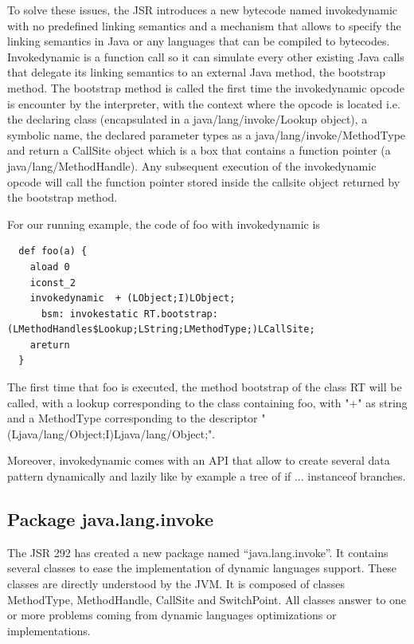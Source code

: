 \documentclass{sigplanconf}
\def \Jsr{JSR\xspace}
\def \JSR{\Jsr 292\xspace}
\def \JVM{JVM\xspace}
\begin{document}
      To solve these issues, the \Jsr introduces a new bytecode named invokedynamic with no predefined
      linking semantics and a mechanism that allows to specify the linking semantics in Java
      or any languages that can be compiled to bytecodes.
      Invokedynamic is a function call so it can simulate every other existing Java calls that delegate
      its linking semantics to an external Java method, the bootstrap method.
      The bootstrap method is called the first time the invokedynamic opcode is encounter by the interpreter,
      with the context where the opcode is located i.e.
      the declaring class (encapsulated in a java/lang/invoke/Lookup object), a symbolic name,
      the declared parameter types as a java/lang/invoke/MethodType and return
      a CallSite object which is a box that contains a function pointer (a java/lang/MethodHandle).
      Any subsequent execution of the invokedynamic opcode will call the function pointer
      stored inside the callsite object returned by the bootstrap method.
      
      For our running example, the code of foo with invokedynamic is
     {\tiny      
      \begin{verbatim}
  def foo(a) {
    aload 0
    iconst_2 
    invokedynamic  + (LObject;I)LObject;
      bsm: invokestatic RT.bootstrap:(LMethodHandles$Lookup;LString;LMethodType;)LCallSite;
    areturn 
  }
      \end{verbatim}
      }

      The first time that foo is executed, the method bootstrap of the class RT will be called, with a lookup corresponding to the class containing foo,
      with "+" as string and a MethodType corresponding to the descriptor "(Ljava/lang/Object;I)Ljava/lang/Object;".

      

      Moreover, invokedynamic comes with an API that allow to create several data pattern
      dynamically and lazily like by example a tree of if ... instanceof branches.

 
      


    \subsection{Package java.lang.invoke}
      The \JSR has created a new package named ``java.lang.invoke''.
      It contains several classes to ease the implementation of dynamic languages support.
      These classes are directly understood by the \JVM.
      It is composed of classes MethodType, MethodHandle, CallSite and SwitchPoint.
      All classes answer to one or more problems coming from dynamic languages optimizations or implementations.
\end{document}
